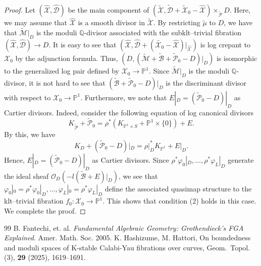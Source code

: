 \documentclass[10pt,a4paper]{amsart}
\begin{document}
\begin{proof}
    Let $(\widehat{\mathcal{X}},\widehat{\mathcal{D}})$ be the main component of $(\widetilde{\mathcal{X}},\widetilde{\mathcal{D}}+\widetilde{\mathcal{X}}_0-\widehat{\mathcal{X}})\times_{\widetilde{\mathcal{P}}}D$.
    Here, we may assume that $\widehat{\mathcal{X}}$ is a smooth divisor in $\widetilde{\mathcal{X}}$.
    By restricting $\tilde{\mu}$ to $D$, we have that $\widetilde{\mathcal{M}}|_D$ is the moduli $\mathbb{Q}$-divisor associated with the subklt--trivial fibration $(\widehat{\mathcal{X}},\widehat{\mathcal{D}})\to D$. 
    It is easy to see that $(\widehat{\mathcal{X}},\widehat{\mathcal{D}}+(\widetilde{\mathcal{X}_0}-\widehat{\mathcal{X}})|_{\widehat{\mathcal{X}}})$ is log crepant to $\mathcal{X}_0$ by the adjunction formula.
    Thus, $(D,(\widetilde{\mathcal{M}}+\widetilde{\mathcal{B}}+\widetilde{\mathcal{P}}_0-D)|_D)$ is isomorphic to the generalized log pair defined by $\mathcal{X}_0\to\mathbb{P}^1$.
    Since $\widetilde{\mathcal{M}}|_D$ is the moduli $\mathbb{Q}$-divisor, it is not hard to see that $(\widetilde{\mathcal{B}}+\widetilde{\mathcal{P}}_0-D)|_D$ is the discriminant divisor with respect to $\mathcal{X}_0\to\mathbb{P}^1$.
    Furthermore, we note that $E|_D=(\widetilde{\mathcal{P}}_0-D)|_D$ as Cartier divisors.
    Indeed, consider the following equation of log canonical divisors
    \[
    K_{\widetilde{\mathcal{P}}}+\widetilde{\mathcal{P}}_{0}=\rho^*(K_{\mathbb{P}^1\times S}+\mathbb{P}^1\times\{0\})+E.
    \]
    By this, we have
    \[
    K_{D}+(\widetilde{\mathcal{P}}_{0}-D)|_D=\rho|_D^*K_{\mathbb{P}^1}+E|_D.
    \]
    Hence, $E|_D=(\widetilde{\mathcal{P}}_0-D)|_D$ as Cartier divisors.
    Since $\rho^*\varphi_0|_D,\ldots,\rho^*\varphi_L|_D$ generate the ideal sheaf $\mathcal{O}_{D}(-l(\widetilde{\mathcal{B}}+E)|_D)$, we see that $\varphi_0|_0=\rho^*\varphi_0|_D,\ldots,\varphi_L|_0=\rho^*\varphi_L|_D$ define the associated quasimap structure to the klt--trivial fibration $f_0\colon \mathcal{X}_0\to\mathbb{P}^1$.
    This shows that condition (2) holds in this case.
    We complete the proof.
    \end{proof}

\begin{thebibliography}{99}
 B. Fantechi, et. al. {\it Fundamental Algebraic Geometry: Grothendieck's FGA Explained}. Amer. Math. Soc. 2005.
 K. Hashizume, M. Hattori, On boundedness and moduli spaces of K-stable Calabi-Yau fibrations over curves, Geom.~Topol. (3), {\bf29} (2025), 1619--1691.
\end{thebibliography}
\end{document}
